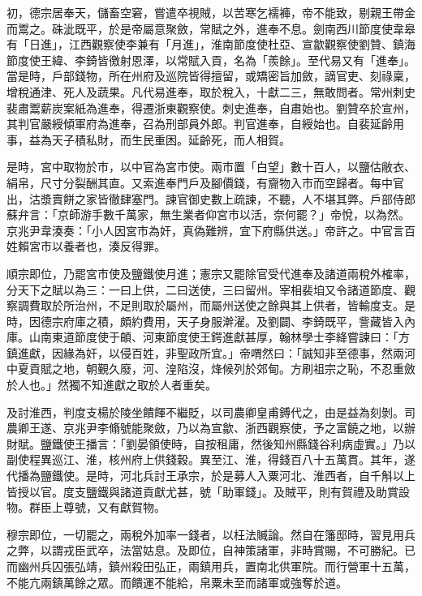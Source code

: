 \begin{pinyinscope}
 初，德宗居奉天，儲畜空窘，嘗遣卒視賊，以苦寒乞襦褲，帝不能致，剔親王帶金而鬻之。硃泚既平，於是帝屬意聚斂，常賦之外，進奉不息。劍南西川節度使韋皋有「日進」，江西觀察使李兼有「月進」，淮南節度使杜亞、宣歙觀察使劉贊、鎮海節度使王緯、李錡皆徼射恩澤，以常賦入貢，名為「羨餘」。至代易又有「進奉」。當是時，戶部錢物，所在州府及巡院皆得擅留，或矯密旨加斂，謫官吏、刻祿稟，增稅通津、死人及蔬果。凡代易進奉，取於稅入，十獻二三，無敢問者。常州刺史裴肅鬻薪炭案紙為進奉，得遷浙東觀察使。刺史進奉，自肅始也。劉贊卒於宣州，其判官嚴綬傾軍府為進奉，召為刑部員外郎。判官進奉，自綬始也。自裴延齡用事，益為天子積私財，而生民重困。延齡死，而人相賀。



 是時，宮中取物於市，以中官為宮市使。兩市置「白望」數十百人，以鹽估敝衣、絹帛，尺寸分裂酬其直。又索進奉門戶及腳價錢，有齎物入市而空歸者。每中官出，沽漿賣餅之家皆徹肆塞門。諫官御史數上疏諫，不聽，人不堪其弊。戶部侍郎蘇弁言：「京師游手數千萬家，無生業者仰宮市以活，奈何罷？」帝悅，以為然。京兆尹韋湊奏：「小人因宮市為奸，真偽難辨，宜下府縣供送。」帝許之。中官言百姓賴宮市以養者也，湊反得罪。



 順宗即位，乃罷宮市使及鹽鐵使月進；憲宗又罷除官受代進奉及諸道兩稅外榷率，分天下之賦以為三：一曰上供，二曰送使，三曰留州。宰相裴垍又令諸道節度、觀察調費取於所治州，不足則取於屬州，而屬州送使之餘與其上供者，皆輸度支。是時，因德宗府庫之積，頗約費用，天子身服澣濯。及劉闢、李錡既平，訾藏皆入內庫。山南東道節度使于頔、河東節度使王鍔進獻甚厚，翰林學士李絳嘗諫曰：「方鎮進獻，因緣為奸，以侵百姓，非聖政所宜。」帝喟然曰：「誠知非至德事，然兩河中夏貢賦之地，朝覲久廢，河、湟陷沒，烽候列於郊甸。方刷祖宗之恥，不忍重斂於人也。」然獨不知進獻之取於人者重矣。



 及討淮西，判度支楊於陵坐饋餫不繼貶，以司農卿皇甫鎛代之，由是益為刻剝。司農卿王遂、京兆尹李翛號能聚斂，乃以為宣歙、浙西觀察使，予之富饒之地，以辦財賦。鹽鐵使王播言：「劉晏領使時，自按租庸，然後知州縣錢谷利病虛實。」乃以副使程異巡江、淮，核州府上供錢穀。異至江、淮，得錢百八十五萬貫。其年，遂代播為鹽鐵使。是時，河北兵討王承宗，於是募人入粟河北、淮西者，自千斛以上皆授以官。度支鹽鐵與諸道貢獻尤甚，號「助軍錢」。及賊平，則有賀禮及助賞設物。群臣上尊號，又有獻賀物。



 穆宗即位，一切罷之，兩稅外加率一錢者，以枉法贓論。然自在籓邸時，習見用兵之弊，以謂戎臣武卒，法當姑息。及即位，自神策諸軍，非時賞賜，不可勝紀。已而幽州兵囚張弘靖，鎮州殺田弘正，兩鎮用兵，置南北供軍院。而行營軍十五萬，不能亢兩鎮萬餘之眾。而饋運不能給，帛粟未至而諸軍或強奪於道。




\end{pinyinscope}
